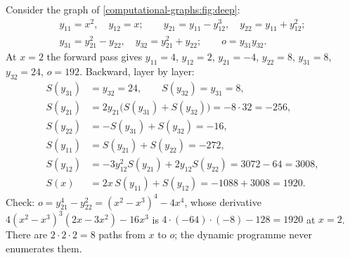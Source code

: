 \begin{notechapter}
\begin{example}\label{computational-graphs:ex:deep}
Consider the graph of \cref{computational-graphs:fig:deep}:
\begin{gather*}
  y_{11} = x^2,\quad y_{12} = x;\qquad y_{21} = y_{11} - y_{12}^3,\quad y_{22} = y_{11} + y_{12}^2;\\
  y_{31} = y_{21}^2 - y_{22},\quad y_{32} = y_{21}^2 + y_{22};\qquad o = y_{31}y_{32} .
\end{gather*}
At $x = 2$ the forward pass gives $y_{11} = 4$, $y_{12} = 2$, $y_{21} = -4$, $y_{22} = 8$, $y_{31} = 8$, $y_{32} = 24$, $o = 192$. Backward,
layer by layer:
\begin{align*}
  S(y_{31}) &= y_{32} = 24, \qquad S(y_{32}) = y_{31} = 8,\\
  S(y_{21}) &= 2y_{21}\bigl(S(y_{31}) + S(y_{32})\bigr) = -8\cdot32 = -256,\\
  S(y_{22}) &= -S(y_{31}) + S(y_{32}) = -16,\\
  S(y_{11}) &= S(y_{21}) + S(y_{22}) = -272,\\
  S(y_{12}) &= -3y_{12}^2S(y_{21}) + 2y_{12}S(y_{22}) = 3072 - 64 = 3008,\\
  S(x) &= 2x\,S(y_{11}) + S(y_{12}) = -1088 + 3008 = 1920 .
\end{align*}
Check: $o = y_{21}^4 - y_{22}^2 = (x^2 - x^3)^4 - 4x^4$, whose derivative $4(x^2 - x^3)^3(2x - 3x^2) - 16x^3$ is
$4\cdot(-64)\cdot(-8) - 128 = 1920$ at $x = 2$. There are $2\cdot2\cdot2 = 8$ paths from $x$ to $o$; the dynamic programme
never enumerates them.
\end{example}


\end{notechapter}
